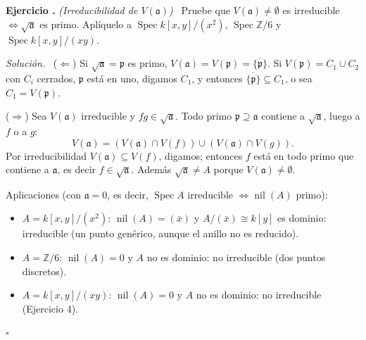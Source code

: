 \documentclass[11pt,a4paper]{article}
\newcommand{\Spec}{\operatorname{Spec}}
\newcommand{\nil}{\operatorname{nil}}
\newcommand{\ZZ}{\mathbb{Z}}
\newcommand{\p}{\mathfrak{p}}
\newcounter{ej}
\newenvironment{ejercicio}[1]{\refstepcounter{ej}\par\bigskip\noindent\textbf{Ejercicio \theej.} \emph{(#1)}\ }{\par}
\newenvironment{solucion}{\par\smallskip\noindent\textit{Solución.}\ }{\hfill$\square$\par}
\begin{document}
\begin{ejercicio}{Irreducibilidad de $V(\mathfrak a)$}
Pruebe que $V(\mathfrak a)\ne\emptyset$ es irreducible $\iff\sqrt{\mathfrak a}$ es primo. Aplíquelo a $\Spec k[x,y]/(x^2)$, $\Spec\ZZ/6$ y $\Spec k[x,y]/(xy)$.
\end{ejercicio}
\begin{solucion}
($\Leftarrow$) Si $\sqrt{\mathfrak a}=\p$ es primo, $V(\mathfrak a)=V(\p)=\overline{\{\p\}}$. Si $V(\p)=C_1\cup C_2$ con $C_i$ cerrados, $\p$ está en uno, digamos $C_1$, y entonces $\overline{\{\p\}}\subseteq C_1$, o sea $C_1=V(\p)$.

($\Rightarrow$) Sea $V(\mathfrak a)$ irreducible y $fg\in\sqrt{\mathfrak a}$. Todo primo $\p\supseteq\mathfrak a$ contiene a $\sqrt{\mathfrak a}$, luego a $f$ o a $g$:
$$V(\mathfrak a)=(V(\mathfrak a)\cap V(f))\cup(V(\mathfrak a)\cap V(g)).$$
Por irreducibilidad $V(\mathfrak a)\subseteq V(f)$, digamos; entonces $f$ está en todo primo que contiene a $\mathfrak a$, es decir $f\in\sqrt{\mathfrak a}$. Además $\sqrt{\mathfrak a}\ne A$ porque $V(\mathfrak a)\ne\emptyset$.

Aplicaciones (con $\mathfrak a=0$, es decir, $\Spec A$ irreducible $\iff\nil(A)$ primo):
\begin{itemize}[itemsep=1pt]
\item $A=k[x,y]/(x^2)$: $\nil(A)=(\bar x)$ y $A/(\bar x)\cong k[y]$ es dominio: irreducible (un punto genérico, aunque el anillo no es reducido).
\item $A=\ZZ/6$: $\nil(A)=0$ y $A$ no es dominio: no irreducible (dos puntos discretos).
\item $A=k[x,y]/(xy)$: $\nil(A)=0$ y $A$ no es dominio: no irreducible (Ejercicio 4).
\end{itemize}
\end{solucion}
\end{document}
